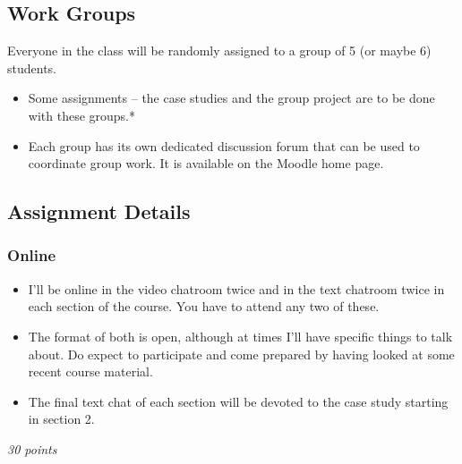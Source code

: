 \documentclass[
]{article}
\providecommand{\tightlist}{%
  \setlength{\itemsep}{0pt}\setlength{\parskip}{0pt}}
\begin{document}
\hypertarget{work-groups}{%
\subsection{Work Groups}\label{work-groups}}

\begin{note}

Everyone in the class will be randomly assigned to a group of 5 (or
maybe 6) students.

\begin{itemize}
\item
  Some assignments -- the case studies and the group project are to be
  done with these groups.*
\item
  Each group has its own dedicated discussion forum that can be used to
  coordinate group work. It is available on the Moodle home page.
\end{itemize}

\end{note}

\hypertarget{assignment-details}{%
\subsection{Assignment Details}\label{assignment-details}}

\begin{assignment}

\hypertarget{online}{%
\subsubsection{Online}\label{online}}

\begin{itemize}
\tightlist
\item
  I'll be online in the video chatroom twice and in the text chatroom
  twice in each section of the course. You have to attend any two of
  these.
\item
  The format of both is open, although at times I'll have specific
  things to talk about. Do expect to participate and come prepared by
  having looked at some recent course material.
\item
  The final text chat of each section will be devoted to the case study
  starting in section 2.
\end{itemize}

\emph{30 points}

\end{assignment}
\end{document}
